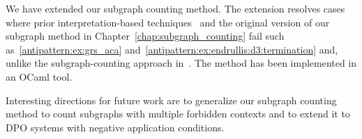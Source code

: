We have extended our subgraph counting method.
The extension resolves cases where prior interpretation-based techniques~\cite{zantema2014termination,bruggink2014termination,bruggink2015proving,endrullis2024generalized_arxiv_v2,overbeek2024termination_lmcs}
and the original version of our subgraph method in Chapter~\ref{chap:subgraph_counting}
fail such as~\autoref{antipattern:ex:grs_aca} and~\autoref{antipattern:ex:endrullis:d3:termination} and, unlike the subgraph-counting approach in~\cite{overbeek2024termination_lmcs}.
The method has been implemented in an OCaml tool.

Interesting directions for future work are to generalize our subgraph counting method to count subgraphs with multiple forbidden contexts and to
 extend it to DPO systems with negative application conditions.
